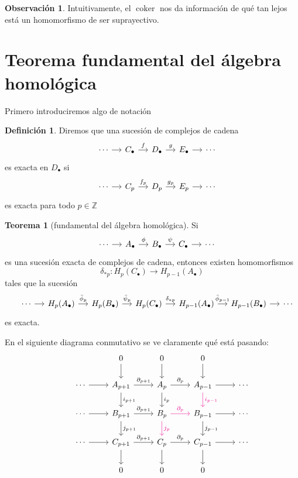 \documentclass[spanish]{book}
\theoremstyle{definition}
\newtheorem*{defn}{Definición}
\newtheorem*{obs}{Observación}
\newtheorem*{teo}{Teorema}
\newcommand{\Z}{\mathbb{Z}}
\DeclareMathOperator{\coker}{coker}
\begin{document}
	\begin{obs}
		Intuitivamente, el $\coker$ nos da información de qué tan lejos está un homomorfismo de ser suprayectivo.
	\end{obs}
\section{Teorema fundamental del álgebra homológica}
	Primero introduciremos algo de notación
	\begin{defn}
		Diremos que una sucesión de complejos de cadena
		\[\begin{tikzcd}[column sep=small]
			&\cdots\arrow{r}&C_\bullet\arrow{r}{f}&D_\bullet\arrow{r}{g}&E_\bullet\arrow{r}&\cdots
		\end{tikzcd}\]
		es exacta en $D_\bullet$ si 
		\[\begin{tikzcd}[column sep=small]
			&\cdots\arrow{r}&C_p\arrow{r}{f_p}&D_p\arrow{r}{g_p}&E_p\arrow{r}&\cdots
		\end{tikzcd}\]
		es exacta para todo $p\in\Z$
	\end{defn}
	\begin{teo}[fundamental del álgebra homológica]
		Si 
		\[\begin{tikzcd}[column sep=small]
			&\cdots\arrow{r}&A_\bullet\arrow{r}{\phi}&B_\bullet\arrow{r}{\psi}&C_\bullet\arrow{r}&\cdots
		\end{tikzcd}\]
		es una sucesión exacta de complejos de cadena, entonces existen homomorfismos \[\delta_{*p}:H_p(C_\bullet)\to H_{p-1}(A_\bullet)\]
		tales que la sucesión
		\[\begin{tikzcd}[column sep=small]
			&\cdots\arrow{r}&H_p(A_\bullet)\arrow{r}{\bar\phi_p}&H_p(B_\bullet)\arrow{r}{\bar\psi_p}&H_p(C_\bullet)\arrow{r}{\delta_{*p}}&H_{p-1}(A_\bullet)\arrow{r}{\bar\phi_{p-1}}&H_{p-1}(B_\bullet)\arrow{r}&\cdots
		\end{tikzcd}\]
		es exacta.
	\end{teo}
	En el siguiente diagrama conmutativo se ve claramente qué está pasando:
	\[
	\begin{tikzcd}
		& & 0 \arrow{d} & 0 \arrow{d} & 0 \arrow{d} & \\
		& \cdots \arrow{r} & A_{p+1} \arrow{r}{\partial_{p+1}} \arrow{d}{i_{p+1}} & A_p \arrow{r}{\partial_p} \arrow{d}{i_p} & A_{p-1} \arrow{r} \arrow[d,magenta,"i_{p-1}"] & \cdots \\
		& \cdots \arrow{r} & B_{p+1} \arrow{r}{\partial_{p+1}} \arrow{d}{j_{p+1}} & B_p \arrow[r,magenta,"\partial_p"] \arrow[d,magenta,"j_p"] & B_{p-1} \arrow{r} \arrow{d}{j_{p-1}} & \cdots \\
		& \cdots \arrow{r} & C_{p+1} \arrow{r}{\partial_{p+1}} \arrow{d} & C_p \arrow{r}{\partial_p} \arrow{d} & C_{p-1} \arrow{r} \arrow{d} & \cdots \\
		& & 0 & 0 & 0 & \\
	\end{tikzcd}
	\]
\end{document}
